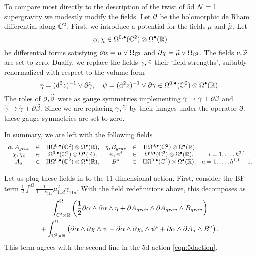 To compare most directly to the description of the twist of 5d $\mathcal N=1$ supergravity we modestly modify the fields. 
Let $\partial$ be the holomorphic de Rham differential along $\mathbb C^2$. 
First, we introduce a potential for the fields $\mu$ and $\widetilde \mu$. 
Let 
\[
\alpha, \chi \in \Omega^{0,\bullet}(\mathbb C^2) \otimes \Omega^\bullet(\mathbb R)
\]
be differential forms satisfying $\partial \alpha = \mu \vee \Omega_{\mathbb C^2}$ and $\partial \chi = \widetilde \mu \vee \Omega_{\mathbb C^2}$. 
The fields $\nu, \widetilde \nu$ are set to zero. 
Dually, we replace the fields $\gamma, \widetilde \gamma$ their `field strengths', suitably renormalized with respect to the volume form
\[
\eta = ({\rm d}^2 z)^{-1} \vee \partial \widetilde \gamma , \quad \psi = ({\rm d}^2 z)^{-1} \vee \partial \gamma \in \Omega^{0,\bullet}(\mathbb C^2) \otimes \Omega^\bullet(\mathbb R) .
\]
The roles of $\beta, \widetilde \beta$ were as gauge symmetries implementing $\gamma \to \gamma + \partial \beta$ and $\widetilde \gamma \to \widetilde \gamma + \partial \widetilde \beta$. 
Since we are replacing $\gamma, \widetilde \gamma$ by their images under the operator $\partial$, these gauge symmetries are set to zero. 

In summary, we are left with the following fields 
\[
\begin{array}{cccccccccc}
\alpha,A_{grav} & \in & \Pi \Omega^{0,\bullet}(\mathbb C^2) \otimes \Omega^\bullet(\mathbb R), & \eta, B_{grav} & \in & \Pi \Omega^{0,\bullet}(\mathbb C^2) \otimes \Omega^\bullet(\mathbb R) \\
\chi, \chi_i & \in & \Omega^{0,\bullet}(\mathbb C^2) \otimes \Omega^\bullet(\mathbb R),  & \psi, \psi^i & \in & \Omega^{0,\bullet}(\mathbb C^2) \otimes \Omega^\bullet(\mathbb R), & i=1,\ldots, h^{2,1}  \\
A_a & \in & \Pi \Omega^{0,\bullet}(\mathbb C^2) \otimes \Omega^\bullet(\mathbb R), & B^a & \in & \Pi \Omega^{0,\bullet}(\mathbb C^2) \otimes \Omega^\bullet(\mathbb R) , & a = 1, \ldots, h^{1,1}-1.
\end{array}
\]

Let us plug these fields in to the 11-dimensional action.
First, consider the BF term $\frac12 \int^{\Omega} \frac{1}{1-\nu_{11d}} \mu_{11d}^2 \gamma_{11d}$. 
With the field redefinitions above, this decomposes as
\begin{multline}\label{eqn:5dsugra1}
 \int_{\mathbb C^2 \times \mathbb R}^\Omega \left( \frac12 \partial \alpha \wedge \partial \alpha \wedge \eta + \partial A_{grav} \wedge \partial A_{grav} \wedge B_{grav} \right) \\
 + \int_{\mathbb C^2 \times \mathbb R}^\Omega \left( \partial \alpha \wedge \partial \chi \wedge \psi + \partial \alpha \wedge \partial \chi_i \wedge \psi^i + \partial \alpha \wedge \partial A_a \wedge B^a \right) .
\end{multline}
This term agrees with the second line in the 5d action \eqref{eqn:5daction}. 

